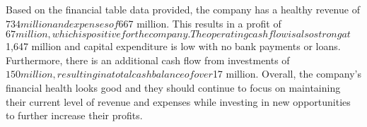 

Based on the financial table data provided, the company has a healthy revenue of $734 million and expenses of $667 million. This results in a profit of $67 million, which is positive for the company. The operating cash flow is also strong at $1,647 million and capital expenditure is low with no bank payments or loans. Furthermore, there is an additional cash flow from investments of $150 million, resulting in a total cash balance of over $17 million. Overall, the company's financial health looks good and they should continue to focus on maintaining their current level of revenue and expenses while investing in new opportunities to further increase their profits.